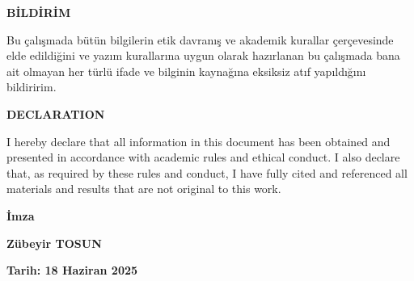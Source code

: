 \begin{center}
\textbf{BİLDİRİM}
\end{center}
\begin{singlespace}%
Bu çalışmada bütün bilgilerin etik davranış ve akademik kurallar çerçevesinde elde edildiğini ve yazım kurallarına uygun olarak hazırlanan bu çalışmada bana ait olmayan her türlü ifade ve bilginin kaynağına eksiksiz atıf yapıldığını bildiririm.
\end{singlespace}
\vspace{2cm}

\begin{center}
\textbf{DECLARATION}
\end{center}
\begin{singlespace}
I hereby declare that all information in this document has been obtained and presented in accordance with academic rules and ethical conduct. I also declare that, as required by these rules and conduct, I have fully cited and referenced all materials and results that are not original to this work.
\end{singlespace}

\vspace{3cm}
\begin{flushright}
\begin{minipage}{5cm}
\begin{center}
\textbf{İmza}

\textbf{Zübeyir TOSUN}

\textbf{Tarih: {18 Haziran 2025}}\hfill
\end{center}
\end{minipage}
\end{flushright}


